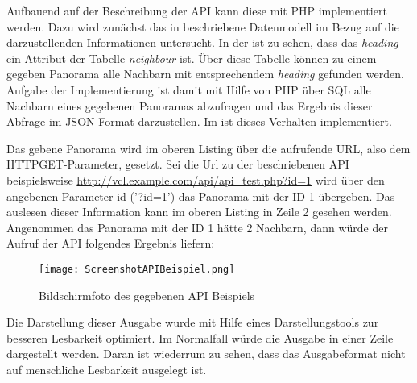 
Aufbauend auf der Beschreibung der API kann diese mit PHP implementiert werden. Dazu wird zunächst das in  beschriebene Datenmodell im Bezug auf die darzustellenden Informationen untersucht. In der  ist zu sehen, dass das \textit{heading} ein Attribut der Tabelle \textit{neighbour} ist. Über diese Tabelle können zu einem gegeben Panorama alle Nachbarn mit entsprechendem \textit{heading} gefunden werden. Aufgabe der Implementierung ist damit mit Hilfe von PHP über SQL alle Nachbarn eines gegebenen Panoramas abzufragen und das Ergebnis dieser Abfrage im JSON-Format darzustellen. Im  ist dieses Verhalten implementiert.



Das gebene Panorama wird im oberen Listing über die aufrufende URL, also dem HTTP\footnotemark GET-Parameter, gesetzt. Sei die Url zu der beschriebenen API beispielsweise \url{http://vcl.example.com/api/api\_test.php?id=1} wird über den angebenen Parameter id ('?id=1') das Panorama mit der ID 1 übergeben. Das auslesen dieser Information kann im oberen Listing in Zeile 2 gesehen werden. Angenommen das Panorama mit der ID 1 hätte 2 Nachbarn, dann würde der Aufruf der API folgendes Ergebnis liefern:


\begin{figure}[htb]
\centering
\texttt{[image: ScreenshotAPIBeispiel.png]}
\caption[API Beispiel]{Bildschirmfoto des gegebenen API Beispiels}
\label{fig:ScreenshotAPIBeispiel}
\end{figure}

Die Darstellung dieser Ausgabe wurde mit Hilfe eines Darstellungstools zur besseren Lesbarkeit optimiert. Im Normalfall würde die Ausgabe in einer Zeile dargestellt werden. Daran ist wiederrum zu sehen, dass das Ausgabeformat nicht auf menschliche Lesbarkeit ausgelegt ist.

